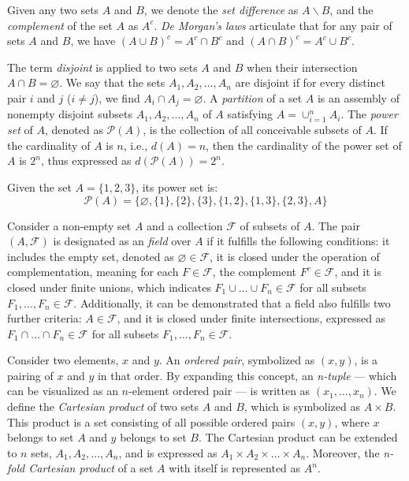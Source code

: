 Given any two sets $A$ and $B$, we denote the \emph{set difference} as $A \backslash B$, and the \emph{complement} of the set $A$ as ${A}^c$. \emph{De Morgan's laws} articulate that for any pair of sets $A$ and $B$, we have $\left( A \cup B \right)^c = A^c \cap B^c$ and $\left( A \cap B \right)^c = A^c \cup B^c$.

The term \emph{disjoint} is applied to two sets $A$ and $B$ when their intersection $A \cap B = \varnothing$. We say that the sets $A_1, A_2, \ldots, A_n$ are disjoint if for every distinct pair $i$ and $j$ ($i \neq j$), we find $A_i \cap A_j = \varnothing$. A \emph{partition} of a set $A$ is an assembly of nonempty disjoint subsets $A_1, A_2, \dots, A_n$ of $A$ satisfying  $A = \cup_{i=1}^n A_i$. The \emph{power set} of $A$, denoted as $\mathcal{P}(A)$, is the collection of all conceivable subsets of $A$. If the cardinality of $A$ is $n$, i.e., $d(A)=n$, then the cardinality of the power set of $A$ is $2^n$, thus expressed as $d\left( \mathcal{P}(A) \right) = 2^n$.

\begin{example}
Given the set $A = \{1, 2, 3\}$, its power set is:
\[
\mathcal{P}(A) = \{\varnothing, \{1\}, \{2\}, \{3\}, \{1,2\}, \{1,3\}, \{2,3\}, A\}
\]
\end{example}

Consider a non-empty set $A$ and a collection $\mathcal{F}$ of subsets of $A$. The pair $\left( A, \mathcal{F} \right)$ is designated as an \emph{field} over $A$ if it fulfills the following conditions: it includes the empty set, denoted as $\varnothing \in \mathcal{F}$, it is closed under the operation of complementation, meaning for each $F \in \mathcal{F}$, the complement $F^c  \in \mathcal{F}$, and it is closed under finite unions, which indicates $F_1 \cup \ldots \cup F_n  \in \mathcal{F}$ for all subsets $F_1, \ldots, F_n \in \mathcal{F}$. Additionally, it can be demonstrated that a field also fulfills two further criteria: $A \in \mathcal{F}$, and it is closed under finite intersections, expressed as $F_1 \cap \ldots \cap F_n  \in \mathcal{F}$ for all subsets $F_1, \ldots, F_n \in \mathcal{F}$.


Consider two elements, $x$ and $y$. An \emph{ordered pair}, symbolized as $(x, y)$, is a pairing of $x$ and $y$ in that order. By expanding this concept, an \emph{n-tuple} — which can be visualized as an $n$-element ordered pair — is written as $(x_1, \ldots, x_n)$. We define the \emph{Cartesian product} of two sets $A$ and $B$, which is symbolized as $A \times B$. This product is a set consisting of all possible ordered pairs $(x, y)$, where $x$ belongs to set $A$ and $y$ belongs to set $B$. The Cartesian product can be extended to $n$ sets, $A_1, A_2, \dots, A_n$, and is expressed as $A_1 \times A_2 \times \dots \times A_n$. Moreover, the \emph{n-fold Cartesian product} of a set $A$ with itself is represented as $A^n$.

